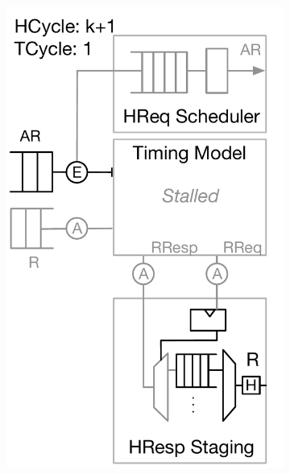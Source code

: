 \begin{figure}[t]
\begin{subfigure}[t]{0.24\textwidth}
        \includegraphics[width=\columnwidth]{figures/model-operation-3.pdf}
        \caption{}
        \label{fig:model-operation-3}
    \end{subfigure}
    \begin{subfigure}[t]{0.23\textwidth}

\end{subfigure}
\end{figure}
